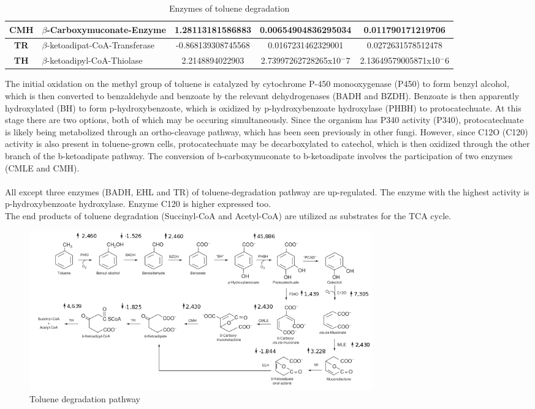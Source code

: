 \documentclass[12pt, a4paper]{report}
\begin{document}
\begin{table}[ht]
\begin{tabular}{c p{4cm}|c|c|c}
		\hline
		\textbf{CMH} & $\beta$-Carboxymuconate-Enzyme &  1.28113181586883 & 0.00654904836295034 & 0.011790171219706 \\
		\hline
		\textbf{TR} & $\beta$-ketoadipat-CoA-Transferase & -0.868139308745568 & 0.0167231462329001 & 0.0272631578512478 \\
		\hline
		\textbf{TH} & $\beta$-ketoadipyl-CoA-Thiolase & 2.2148894022903 & 2.73997262728265x10$^-7$ & 2.13649579005871x10$^-6$ \\ 
		\hline	
	\end{tabular}
	\caption{Enzymes of toluene degradation}
	\label{tolenzymes}
\end{table}

The initial oxidation on the methyl group of toluene is catalyzed by cytochrome P-450 monooxygenase (P450) to form benzyl alcohol, which is then converted to benzaldehyde and benzoate by the relevant dehydrogenases (BADH and BZDH). Benzoate is then apparently hydroxylated (BH) to form p-hydroxybenzoate, which is oxidized by p-hydroxybenzoate hydroxylase (PHBH) to protocatechuate. At this stage there are two options, both of which may be occuring simultaneously. Since the organism has P340 activity (P340), protocatechuate is likely being metabolized through an ortho-cleavage pathway, which has been seen previously in other fungi. However, since C12O (C120) activity is also present in toluene-grown cells, protocatechuate may be decarboxylated to catechol, which is then oxidized through the other branch of the b-ketoadipate pathway.  The conversion of b-carboxymuconate to b-ketoadipate involves the participation of two enzymes (CMLE and CMH). \cite{Parales2008} \\
\ \\
All except three enzymes (BADH, EHL and TR) of toluene-degradation pathway are up-regulated. The enzyme with the highest activity is p-hydroxybenzoate hydroxylase. Enzyme C120 is higher expressed too. \\
The end products of toluene degradation (Succinyl-CoA and Acetyl-CoA) are utilized as substrates for the TCA cycle. \\

 \begin{figure}[H]
 	\centering	
 	\includegraphics[width=420pt]{pics/toldeg_UPDOWN.png}
 	\caption[Toluene degradation pathway]
 	{Toluene degradation pathway}
 	\label{ToluendegUPDOWN}
 		\end{figure}
 
\end{document}
